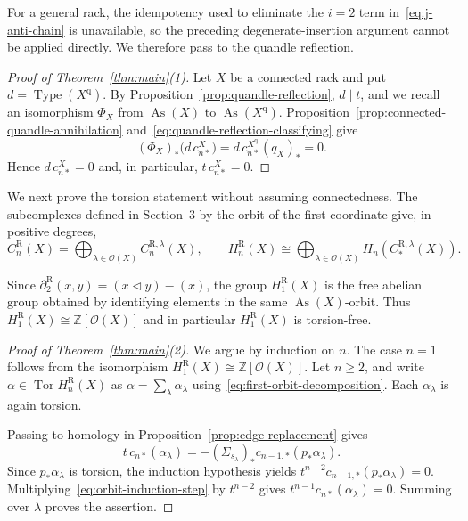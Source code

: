 \documentclass[11pt]{article}
\DeclareMathOperator{\As}{As}
\DeclareMathOperator{\Tor}{Tor}
\DeclareMathOperator{\Type}{Type}
\newcommand{\ZZ}{\mathbb Z}
\newcommand{\OO}{\mathcal O}
\newcommand{\R}{\mathrm R}
\begin{document}
For a general rack, the idempotency used to eliminate the $i=2$ term in~\eqref{eq:j-anti-chain} is unavailable, so the preceding degenerate-insertion argument cannot be applied directly. We therefore pass to the quandle reflection.

\begin{proof}[Proof of Theorem~\ref{thm:main}(1)]
Let $X$ be a connected rack and put $d=\Type(X^{\mathrm q})$. By Proposition~\ref{prop:quandle-reflection}, $d\mid t$, and we recall an isomorphism $ \Phi_X$ from $\As(X)$ to $\As(X^{\mathrm q})$. Proposition~\ref{prop:connected-quandle-annihilation} and~\eqref{eq:quandle-reflection-classifying} give
\[
 (\Phi_X)_*\bigl(d\,c_{n*}^X\bigr)
 =d\,c_{n*}^{X^{\mathrm q}}(q_X)_*=0.
\]
Hence $d\,c_{n*}^X=0$ and, in particular, $t\,c_{n*}^X=0$.
\end{proof}

We next prove the torsion statement without assuming connectedness. The subcomplexes defined in Section~3 by the orbit of the first coordinate give, in positive degrees,
\begin{equation}
        C_n^\R(X)=
        \bigoplus_{\lambda\in\OO(X)}C_n^{\R,\lambda}(X),
        \qquad
        H_n^\R(X)\cong
        \bigoplus_{\lambda\in\OO(X)}
        H_n(C_*^{\R,\lambda}(X)).
\label{eq:first-orbit-decomposition}
\end{equation}

Since $\partial_2^\R(x,y)=(x\lhd y)-(x)$, the group $H_1^\R(X)$ is the free abelian group obtained by identifying elements in the same $\As(X)$-orbit. Thus
$  H_1^\R(X)\cong\ZZ[\OO(X)]$
and in particular $H_1^\R(X)$ is torsion-free.

\begin{proof}[Proof of Theorem~\ref{thm:main}(2)]
We argue by induction on $n$. The case $n=1$ follows from the isomorphism $  H_1^\R(X)\cong\ZZ[\OO(X)]$. Let $n\ge2$, and write $\alpha\in\Tor H_n^\R(X)$ as $\alpha=\sum_\lambda\alpha_\lambda$ using~\eqref{eq:first-orbit-decomposition}. Each $\alpha_\lambda$ is again torsion.

Passing to homology in Proposition~\ref{prop:edge-replacement} gives
\begin{equation}
 t\,c_{n*}(\alpha_\lambda)
 =-(\Sigma_{s_\lambda})_*c_{n-1,*}(p_*\alpha_\lambda).
 \label{eq:orbit-induction-step}
\end{equation}
Since $p_*\alpha_\lambda$ is torsion, the induction hypothesis yields
$t^{n-2}c_{n-1,*}(p_*\alpha_\lambda)=0$. Multiplying~\eqref{eq:orbit-induction-step} by $t^{n-2}$ gives $t^{n-1}c_{n*}(\alpha_\lambda)=0$. Summing over $\lambda$ proves the assertion.
\end{proof}
\end{document}
